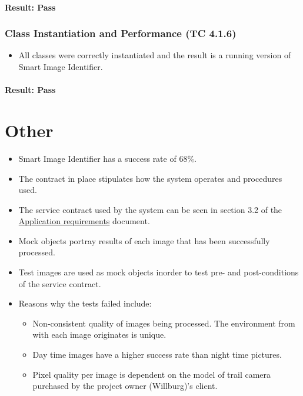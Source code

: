 \documentclass[a4paper,12pt]{report}
\begin{document}
		\paragraph{Result: Pass}
		
		\subsubsection{Class Instantiation and Performance (TC 4.1.6)}
		\begin {itemize}
		\item All classes were correctly instantiated and the result is a running version of Smart Image Identifier.
		\end {itemize}
		\paragraph{Result: Pass}
		
	\section{Other}
		\begin {itemize}
			\item Smart Image Identifier has a success rate of 68\%.
			\item The contract in place stipulates how the system operates and procedures used.
			\item The service contract used by the system can be seen in section 3.2 of the \href{https://github.com/StephenSwanepoel/Ambitious-Designs/blob/master/Architecture\%20Requirements/doc1.pdf}{Application requirements}  document. 
			\item Mock objects portray results of each image that has been successfully processed.
			\item Test images are used as mock objects inorder to test pre- and post-conditions of the service contract.
			\item Reasons why the tests failed include:
			\begin{itemize}
				\item Non-consistent quality of images being processed. The environment from with each image originates is unique.
				\item Day time images have a higher success rate than night time pictures.
				\item Pixel quality per image is dependent on the model of trail camera purchased by the project owner (Willburg)'s client.
			\end{itemize}
		\end {itemize}
\newpage		
\end{document}
